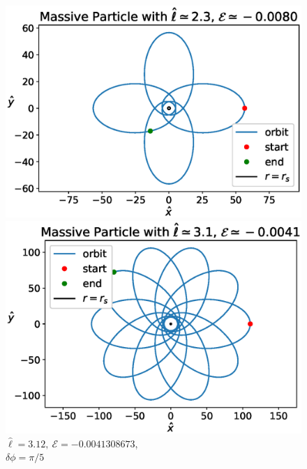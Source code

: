 \begin{figure}[h!]
    \begin{minipage}{0.49\textwidth}
        \centering
        \includegraphics[width=\textwidth]{Figures/appendixB/beautiful4.eps}
        \caption{$\hat \ell = 2.33, ~ \mathcal E = -0.0079962099$, \\
        $\delta \phi = \pi / 2$}
        \label{appB:fig:n4}
    \end{minipage}
    \hspace{0.01\textwidth}
    \begin{minipage}{0.49\textwidth}
        \centering
        \includegraphics[width=\textwidth]{Figures/appendixB/beautiful10.eps}
        \caption{$\hat \ell = 3.12, ~ \mathcal E = -0.0041308673$, \\
        $\delta \phi = \pi / 5$}
        \label{appB:fig:n10}
    \end{minipage}
\end{figure}


